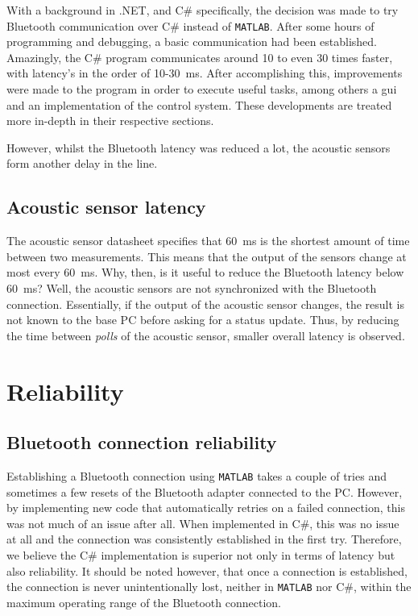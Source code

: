\documentclass[11pt,titlepage]{report}
\begin{document}
With a background in .NET, and C\# specifically, the decision was made to try Bluetooth communication over C\# instead of \texttt{MATLAB}. After some hours of programming and debugging, a basic communication had been established. Amazingly, the C\# program communicates around 10 to even 30 times faster, with latency's in the order of 10-\SI{30}{ms}. After accomplishing this, improvements were made to the program in order to execute useful tasks, among others a gui and an implementation of the control system. These developments are treated more in-depth in their respective sections.

However, whilst the Bluetooth latency was reduced a lot, the acoustic sensors form another delay in the line.
\subsection{Acoustic sensor latency}
The acoustic sensor datasheet specifies that \SI{60}{ms} is the shortest amount of time between two measurements. This means that the output of the sensors change at most every \SI{60}{ms}. Why, then, is it useful to reduce the Bluetooth latency below \SI{60}{ms}? Well, the acoustic sensors are not synchronized with the Bluetooth connection. Essentially, if the output of the acoustic sensor changes, the result is not known to the base PC before asking for a status update. Thus, by reducing the time between \textit{polls} of the acoustic sensor, smaller overall latency is observed.

\section{Reliability}
\subsection{Bluetooth connection reliability}
Establishing a Bluetooth connection using \texttt{MATLAB} takes a couple of tries and sometimes a few resets of the Bluetooth adapter connected to the PC. However, by implementing new code that automatically retries on a failed connection, this was not much of an issue after all. When implemented in C\#, this was no issue at all and the connection was consistently established in the first try. Therefore, we believe the C\# implementation is superior not only in terms of latency but also reliability. It should be noted however, that once a connection is established, the connection is never unintentionally lost, neither in \texttt{MATLAB} nor C\#, within the maximum operating range of the Bluetooth connection.
\end{document}
